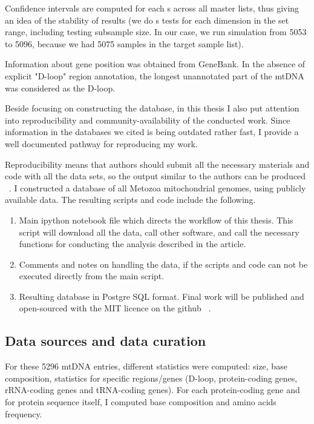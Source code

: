 \documentclass[a4paper,11pt]{article}
\begin{document}
Confidence intervals are computed for each s across all master lists, thus giving an idea of the stability of results (we do s tests for each dimension in the set range, including testing subsample size. In our case, we run simulation from 5053 to 5096, because we had 5075 samples in the target sample list).

Information about gene position was obtained from GeneBank. In the absence of explicit "D-loop" region annotation, the longest unannotated part of the mtDNA was considered as the D-loop. 

Beside focusing on constructing the database, in this thesis I also put attention into reproducibility and community-availability of the conducted work. Since information in the databases we cited is being outdated rather fast, I provide a well documented pathway for reproducing my work. 

Reproducibility means that authors should submit all the necessary materials and code with all the data sets, so the output similar to the authors can be produced ~\cite{peng2009reproducible}. I constructed a database of all Metozoa mitochondrial genomes, using publicly available data. The resulting scripts and code include the following.

\begin{enumerate}
\item Main ipython notebook file which directs the workflow of this thesis. This script will download all the data, call other software, and call the necessary functions for conducting the analysis described in the article. 
\item Comments and notes on handling the data, if the scripts and code can not be executed directly from the main script.
\item Resulting database in Postgre SQL format. Final work will be published and open-sourced with the MIT licence on the github ~\cite{metmitdb, metmitdbgithub}.
\end{enumerate}

\subsection{Data sources and data curation}
For these 5296 mtDNA entries, different statistics were computed: size, base composition, statistics for  specific regions/genes (D-loop, protein-coding genes, rRNA-coding genes and tRNA-coding genes). For each protein-coding gene and for protein sequence itself, I computed base composition and amino acids frequency. 
\end{document}
